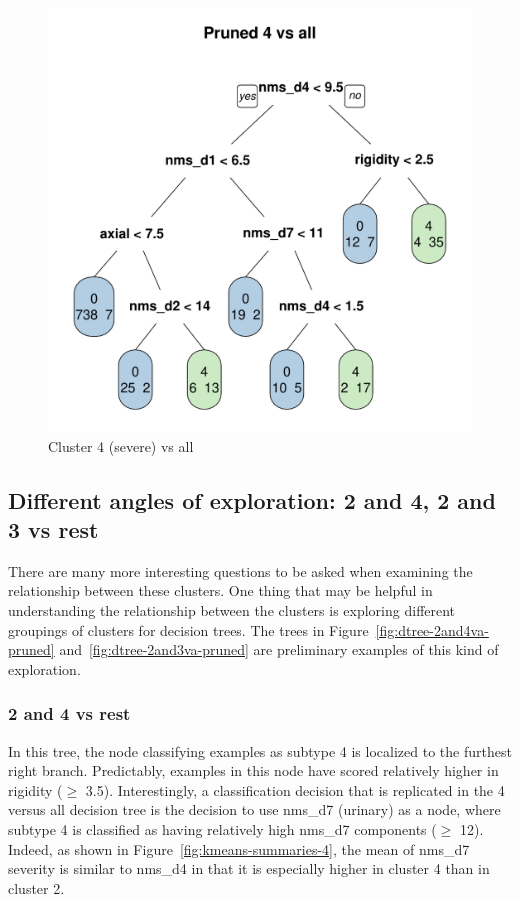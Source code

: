 \documentclass[10pt]{article}
\begin{document}
\begin{multicols}{2}
\begin{figure}[H]
  \includegraphics[width=0.75\linewidth]{dtree-4va-pruned.pdf}
  \caption{Cluster 4 (severe) vs all}
  \label{fig:4va}
\end{figure}

\subsection{Different angles of exploration: 2 and 4, 2 and 3 vs rest}

There are many more interesting questions to be asked when examining the
relationship between these clusters. One thing that may be helpful in
understanding the relationship between the clusters is exploring different
groupings of clusters for decision trees. The trees in
Figure~\ref{fig:dtree-2and4va-pruned} and~\ref{fig:dtree-2and3va-pruned} are
preliminary examples of this kind
of exploration.

\subsubsection{2 and 4 vs rest}
In this tree, the node classifying examples as subtype 4 is
localized to the furthest right branch. Predictably, examples in this node have
scored relatively higher in rigidity ($\geq$ 3.5). Interestingly, a classification
decision that is replicated in the 4 versus all decision tree is the decision
to use nms\_d7 (urinary) as a node, where subtype 4 is classified as having
relatively high nms\_d7 components ($\geq$ 12). Indeed, as shown in
Figure~\ref{fig:kmeans-summaries-4}, the mean of nms\_d7 severity is similar to
nms\_d4 in that it is especially higher in cluster 4 than in cluster 2.


\end{multicols}
\end{document}
